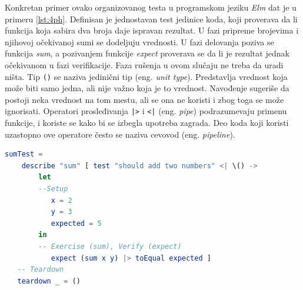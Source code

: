 \documentclass[12pt,oneside]{memoir}
\begin{document}
\par Konkretan primer ovako organizovanog testa u programskom jeziku \emph{Elm} dat je u primeru \ref{lst:4ph}. Definisan je jednostavan test jedinice koda, koji proverava da li funkcija koja sabira dva broja daje ispravan rezultat. U fazi pripreme brojevima i njihovoj očekivanoj sumi se dodeljuju vrednosti. U fazi delovanja poziva se funkcija \emph{sum}, a pozivanjem funkcije \emph{expect} proverava se da li je rezultat jednak očekivanom u fazi verifikacije. Faza rušenja u ovom slučaju ne treba da uradi ništa. Tip \texttt{()} se naziva jedinični tip (eng. \emph{unit type}). Predstavlja vrednost koja može biti samo jedna, ali nije važno koja je to vrednost. Navođenje \texttt{\textunderscore} sugeriše da postoji neka vrednost na tom mestu, ali se ona ne koristi i zbog toga se može ignorisati. Operatori prosleđivanja \texttt{|>} i \texttt{<|} (eng. \emph{pipe}) podrazumevaju primenu funkcije, i koriste se kako bi se izbegla upotreba zagrada. Deo koda koji koristi uzastopno ove operatore često se naziva cevovod (eng. \emph{pipeline}). 

\begin{minipage}{\linewidth}
\begin{lstlisting}[language=elm, basicstyle=\small, caption={Četiri faze testa koji proverava ispravnost
funkcije sabiranja dva broja},captionpos=b, label={lst:4ph}]
sumTest =
    describe "sum" [ test "should add two numbers" <| \() -> 
        let
        --Setup
           x = 2
           y = 3
           expected = 5
        in
        -- Exercise (sum), Verify (expect)
           expect (sum x y) |> toEqual expected ]
   -- Teardown
   teardown _ = ()
\end{lstlisting}
\end{minipage}
\end{document}
